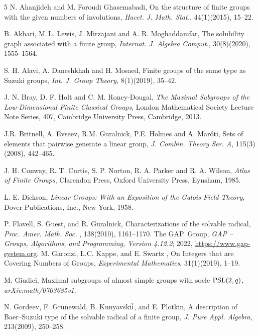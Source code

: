 \documentclass{amsart}
\theoremstyle{definition}
\theoremstyle{remark}
\begin{document}
\begin{thebibliography}{5}
 N. Ahanjideh and M. Foroudi Ghasemabadi, On the structure of finite groups with the given numbers of involutions, {\em Hacet. J. Math. Stat.}, 44(1)(2015), 15--22.

 B. Akbari, M.\,L. Lewis, J. Mirzajani and A. R. Moghaddamfar, The solubility graph associated with a finite group, {\em Internat. J. Algebra Comput.}, 30(8)(2020), 1555--1564.

 S. H. Alavi, A. Daneshkhah and H. Mosaed, Finite groups of the same type as Suzuki groups, {\em Int. J. Group Theory}, 8(1)(2019), 35--42.

 J. N. Bray, D. F. Holt and C. M. Roney-Dougal, {\em The Maximal Subgroups of the Low-Dimensional Finite Classical Groups}, London Mathematical Society Lecture Note Series, 407, Cambridge University Press, Cambridge, 2013.
 
 J.R. Britnell, A. Evseev, R.M. Guralnick, P.E. Holmes and A. Mar\'oti, Sets of elements that pairwise generate a linear group, {\em J. Combin. Theory Ser. A}, 115(3)(2008), 442--465.

 J. H. Conway, R. T. Curtis, S. P. Norton,
R. A. Parker and R. A. Wilson, {\em Atlas of Finite Groups},
Clarendon Press, Oxford University Press, Eynsham, 1985.

  L. E. Dickson, {\em Linear Groups: With an Exposition of the Galois Field Theory}, Dover Publications, Inc., New York, 1958.

 P. Flavell, S. Guest, and R. Guralnick, Characterizations of the solvable radical, {\em Proc. Amer. Math. Soc. }, 138(2010), 1161--1170.
  The GAP~Group, \emph{GAP -- Groups, Algorithms, and Programming, 
  Version 4.12.2}; 
  2022,
  \url{https://www.gap-system.org}.
 M. Garonzi, L.C.  Kappe,  and E. Swartz
, On Integers that are Covering Numbers of Groups, {\em Experimental Mathematics}, 31(1)(2019), 1--19.

 M. Giudici, Maximal subgroups of almost simple groups with socle ${\rm PSL}(2,q)$, {\em arXiv:math/0703685v1}.

 N. Gordeev, F. Grunewald, B. Kunyavski${\rm \breve{i}}$, and E. Plotkin, A description of Baer–Suzuki type of the solvable radical of a finite group, {\em J. Pure Appl. Algebra}, 213(2009), 250--258.


\end{thebibliography}
\end{document}
